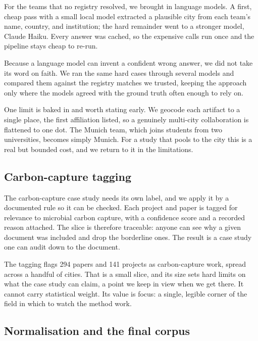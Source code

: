 \documentclass[12pt,a4paper]{article}
\begin{document}
	For the teams that no registry resolved, we brought in language models. A first,
	cheap pass with a small local model extracted a plausible city from each team's
	name, country, and institution; the hard remainder went to a stronger model,
	Claude Haiku. Every answer was cached, so the expensive calls run once and the
	pipeline stays cheap to re-run.
	
	Because a language model can invent a confident wrong answer, we did not take its
	word on faith. We ran the same hard cases through several models and compared them
	against the registry matches we trusted, keeping the approach only where the
	models agreed with the ground truth often enough to rely on.
	
	One limit is baked in and worth stating early. We geocode each artifact to a
	single place, the first affiliation listed, so a genuinely multi-city
	collaboration is flattened to one dot. The Munich team, which joins students from
	two universities, becomes simply Munich. For a study that pools to the city this
	is a real but bounded cost, and we return to it in the limitations.
	
	\subsection{Carbon-capture tagging}
	
	The carbon-capture case study needs its own label, and we apply it by a documented
	rule so it can be checked. Each project and paper is tagged for relevance to
	microbial carbon capture, with a confidence score and a recorded reason attached.
	The slice is therefore traceable: anyone can see why a given document was included
	and drop the borderline ones. The result is a case study one can audit down to the
	document.
	
	The tagging flags 294 papers and 141 projects as carbon-capture work, spread
	across a handful of cities. That is a small slice, and its size sets hard limits on
	what the case study can claim, a point we keep in view when we get there. It cannot
	carry statistical weight. Its value is focus: a single, legible corner of the field
	in which to watch the method work.
	
	\subsection{Normalisation and the final corpus}
	
\end{document}
